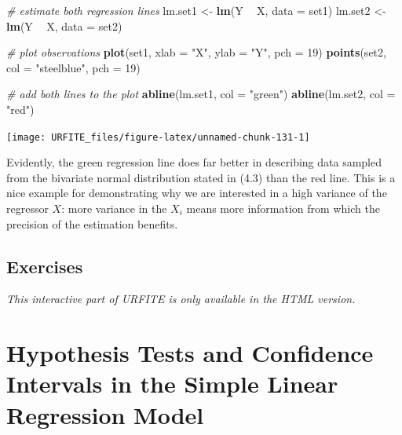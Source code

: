 \documentclass[]{book}
\newenvironment{Shaded}{\begin{snugshade}}{\end{snugshade}}
\newcommand{\KeywordTok}[1]{\textcolor[rgb]{0.13,0.29,0.53}{\textbf{#1}}}
\newcommand{\DataTypeTok}[1]{\textcolor[rgb]{0.13,0.29,0.53}{#1}}
\newcommand{\DecValTok}[1]{\textcolor[rgb]{0.00,0.00,0.81}{#1}}
\newcommand{\StringTok}[1]{\textcolor[rgb]{0.31,0.60,0.02}{#1}}
\newcommand{\CommentTok}[1]{\textcolor[rgb]{0.56,0.35,0.01}{\textit{#1}}}
\newcommand{\OperatorTok}[1]{\textcolor[rgb]{0.81,0.36,0.00}{\textbf{#1}}}
\newcommand{\NormalTok}[1]{#1}
\theoremstyle{definition}
\theoremstyle{definition}
\theoremstyle{definition}
\theoremstyle{remark}
\begin{document}
\begin{Shaded}
\begin{Highlighting}[]
\CommentTok{# estimate both regression lines}
\NormalTok{lm.set1 <-}\StringTok{ }\KeywordTok{lm}\NormalTok{(Y }\OperatorTok{~}\StringTok{ }\NormalTok{X, }\DataTypeTok{data =}\NormalTok{ set1)}
\NormalTok{lm.set2 <-}\StringTok{ }\KeywordTok{lm}\NormalTok{(Y }\OperatorTok{~}\StringTok{ }\NormalTok{X, }\DataTypeTok{data =}\NormalTok{ set2)}

\CommentTok{# plot observations}
\KeywordTok{plot}\NormalTok{(set1, }\DataTypeTok{xlab =} \StringTok{"X"}\NormalTok{, }\DataTypeTok{ylab =} \StringTok{"Y"}\NormalTok{, }\DataTypeTok{pch =} \DecValTok{19}\NormalTok{)}
\KeywordTok{points}\NormalTok{(set2, }\DataTypeTok{col =} \StringTok{"steelblue"}\NormalTok{, }\DataTypeTok{pch =} \DecValTok{19}\NormalTok{)}

\CommentTok{# add both lines to the plot}
\KeywordTok{abline}\NormalTok{(lm.set1, }\DataTypeTok{col =} \StringTok{"green"}\NormalTok{)}
\KeywordTok{abline}\NormalTok{(lm.set2, }\DataTypeTok{col =} \StringTok{"red"}\NormalTok{)}
\end{Highlighting}
\end{Shaded}

\begin{center}\texttt{[image: URFITE\_files/figure-latex/unnamed-chunk-131-1]} \end{center}

Evidently, the green regression line does far better in describing data
sampled from the bivariate normal distribution stated in (4.3) than the
red line. This is a nice example for demonstrating why we are interested
in a high variance of the regressor \(X\): more variance in the \(X_i\)
means more information from which the precision of the estimation
benefits.

\section{Exercises}\label{exercises-2}

\begin{center}\textit{This interactive part of URFITE is only available in the HTML version.}\end{center}

\chapter{Hypothesis Tests and Confidence Intervals in the Simple Linear
Regression
Model}\label{hypothesis-tests-and-confidence-intervals-in-the-simple-linear-regression-model}
\end{document}
